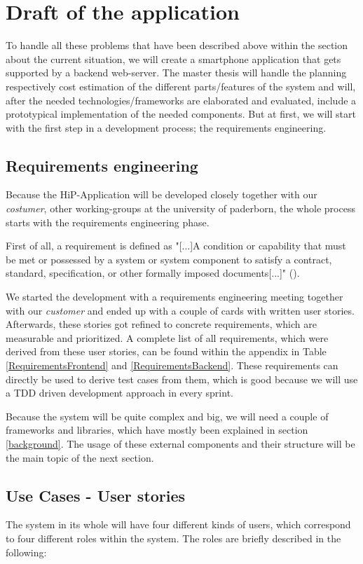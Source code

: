 \chapter[Draft of the application]{Draft of the application}
To handle all these problems that have been described above within the section about the current situation, we will create a smartphone application that gets supported by a backend web-server. The master thesis will handle the planning respectively cost estimation of the different parts/features of the system and will, after the needed technologies/frameworks are elaborated and evaluated, include a prototypical implementation of the needed components.
But at first, we will start with the first step in a development process; the requirements engineering.

\section{Requirements engineering}
Because the HiP-Application will be developed closely together with our \textit{costumer}, other working-groups at the university of paderborn, the whole process starts with the requirements engineering phase.

First of all, a requirement is defined as "[...]A condition or capability that must be met or possessed by a system or system component to satisfy a contract, standard, specification, or other formally imposed documents[...]" (\cite{IEEEReq}).

We started the development with a requirements engineering meeting together with our \textit{customer} and ended up with a couple of cards with written user stories. Afterwards, these stories got refined to concrete requirements, which are measurable and prioritized. A complete list of all requirements, which were derived from these user stories, can be found within the appendix in Table \ref{RequirementsFrontend} and \ref{RequirementsBackend}. These requirements can directly be used to derive test cases from them, which is good because we will use a \ac{TDD} driven development approach in every sprint. 

Because the system will be quite complex and big, we will need a couple of frameworks and libraries, which have mostly been explained in section \ref{background}. 
The usage of these external components and their structure will be the main topic of the next section.

\section{Use Cases - User stories}
The system in its whole will have four different kinds of users, which correspond to four different roles within the system. The roles are briefly described in the following:

